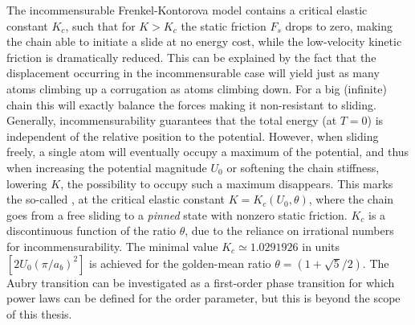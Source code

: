 The incommensurable Frenkel-Kontorova model contains a critical elastic constant $K_c$, such that for $K > K_c$ the static friction $F_s$ drops to zero, making the chain able to initiate a slide at no energy cost, while the low-velocity kinetic friction is dramatically reduced. This can be explained by the
fact that the displacement occurring in the incommensurable case will yield just
as many atoms climbing up a corrugation as atoms climbing down. For a big (infinite) chain this will exactly balance the forces making it
non-resistant to sliding. Generally, incommensurability guarantees that the
total energy (at $T=0$) is independent of the relative position to the
potential. However, when sliding freely, a single atom will eventually occupy a
maximum of the potential, and thus when increasing the potential magnitude $U_0$ or
softening the chain stiffness, lowering $K$, the possibility to occupy such a
maximum disappears. This marks the so-called ,
at the critical elastic constant $K = K_c(U_0, \theta)$, where the chain goes
from a free sliding to a \textit{pinned} state with nonzero static friction.
$K_c$ is a discontinuous function of the ratio $\theta$, due to the reliance on
irrational numbers for incommensurability. The minimal
value $K_c \simeq 1.0291926 $ in units $[2 U_0 (\pi / a_b)^2]$ is achieved for
the golden-mean ratio $\theta = (1+\sqrt{5}/2)$. The Aubry transition can be investigated as a first-order phase transition for which power laws can be defined for the order parameter, but this is beyond the scope of this thesis.




